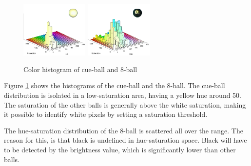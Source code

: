 \begin{figure}[H]
\centering
\subfloat
{
	\includegraphics[width=0.3\textwidth]{images/ballhist/0}
}
\subfloat
{
	\includegraphics[width=0.3\textwidth]{images/ballhist/8}
}
\caption{Color histogram of cue-ball and 8-ball}
\label{fig:ballhist-cue-8}
\end{figure}
Figure \ref{fig:ballhist-cue-8} shows the histograms of the cue-ball and the 8-ball. The cue-ball distribution is isolated in a low-saturation area, having a yellow hue around 50. The saturation of the other balls is generally above the white saturation, making it possible to identify white pixels by setting a saturation threshold.

The hue-saturation distribution of the 8-ball is scattered all over the range. The reason for this, is that black is undefined in hue-saturation space. Black will have to be detected by the brightness value, which is significantly lower than other balls.

